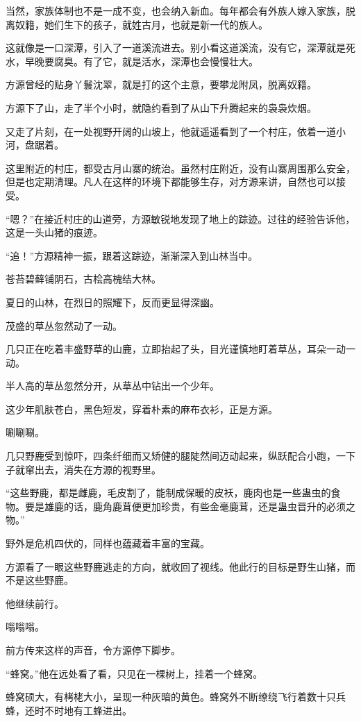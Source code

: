 \begin{this_body}
当然，家族体制也不是一成不变，也会纳入新血。每年都会有外族人嫁入家族，脱离奴籍，她们生下的孩子，就姓古月，也就是新一代的族人。

这就像是一口深潭，引入了一道溪流进去。别小看这道溪流，没有它，深潭就是死水，早晚要腐臭。有了它，就是活水，深潭也会慢慢壮大。

方源曾经的贴身丫鬟沈翠，就是打的这个主意，要攀龙附凤，脱离奴籍。

方源下了山，走了半个小时，就隐约看到了从山下升腾起来的袅袅炊烟。

又走了片刻，在一处视野开阔的山坡上，他就遥遥看到了一个村庄，依着一道小河，盘踞着。

这里附近的村庄，都受古月山寨的统治。虽然村庄附近，没有山寨周围那么安全，但是也定期清理。凡人在这样的环境下都能够生存，对方源来讲，自然也可以接受。

“嗯？”在接近村庄的山道旁，方源敏锐地发现了地上的踪迹。过往的经验告诉他，这是一头山猪的痕迹。

“追！”方源精神一振，跟着这踪迹，渐渐深入到山林当中。

苍苔碧藓铺阴石，古桧高槐结大林。

夏日的山林，在烈日的照耀下，反而更显得深幽。

茂盛的草丛忽然动了一动。

几只正在吃着丰盛野草的山鹿，立即抬起了头，目光谨慎地盯着草丛，耳朵一动一动。

半人高的草丛忽然分开，从草丛中钻出一个少年。

这少年肌肤苍白，黑色短发，穿着朴素的麻布衣衫，正是方源。

唰唰唰。

几只野鹿受到惊吓，四条纤细而又矫健的腿陡然间迈动起来，纵跃配合小跑，一下子就窜出去，消失在方源的视野里。

“这些野鹿，都是雌鹿，毛皮割了，能制成保暖的皮袄，鹿肉也是一些蛊虫的食物。要是雄鹿的话，鹿角鹿茸便更加珍贵，有些金毫鹿茸，还是蛊虫晋升的必须之物。”

野外是危机四伏的，同样也蕴藏着丰富的宝藏。

方源看了一眼这些野鹿逃走的方向，就收回了视线。他此行的目标是野生山猪，而不是这些野鹿。

他继续前行。

嗡嗡嗡。

前方传来这样的声音，令方源停下脚步。

“蜂窝。”他在远处看了看，只见在一棵树上，挂着一个蜂窝。

蜂窝硕大，有栲栳大小，呈现一种灰暗的黄色。蜂窝外不断缭绕飞行着数十只兵蜂，还时不时地有工蜂进出。


\end{this_body}
